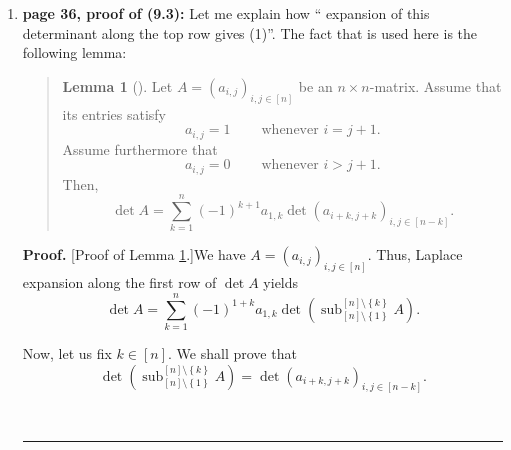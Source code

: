 \documentclass[numbers=enddot,12pt,final,onecolumn,notitlepage]{scrartcl}%
\newenvironment{statement}{\begin{quote}}{\end{quote}}
\theoremstyle{definition}
\newtheorem{lem}[theo]{Lemma}
\newenvironment{lemmain}[1][]
{\begin{statement}\begin{lem}[#1]}
{\end{lem}\end{statement}}
\newenvironment{proof}[1][Proof]{\noindent\textbf{#1.} }{\ \rule{0.5em}{0.5em}}
\newenvironment{lemmain}[1][Proof]{\noindent\textbf{#1.} }{\ \rule{0.5em}{0.5em}}
\let\sumnonlimits\sum
\renewcommand{\sum}{\sumnonlimits\limits}
\begin{document}
\begin{enumerate}
Again, this can be done by observing that both matrices belong to the group
$\operatorname*{UT}\nolimits_{I}$ of all upper unitriangular matrices with
rows and columns indexed by the elements of $I$.

\item \textbf{page 36, proof of (9.3):} Let me explain how \textquotedblleft
expansion of this determinant along the top row gives (1)\textquotedblright.
The fact that is used here is the following lemma:

\begin{lemmain}
\label{lem.36.det-hess}Let $A=\left(  a_{i,j}\right)  _{i,j\in\left[
n\right]  }$ be an $n\times n$-matrix. Assume that its entries satisfy%
\begin{equation}
a_{i,j}=1\ \ \ \ \ \ \ \ \ \ \text{whenever }i=j+1.
\label{eq.lem.36.det-hess.ass.1}%
\end{equation}
Assume furthermore that%
\begin{equation}
a_{i,j}=0\ \ \ \ \ \ \ \ \ \ \text{whenever }i>j+1.
\label{eq.lem.36.det-hess.ass.0}%
\end{equation}
Then,%
\[
\det A=\sum_{k=1}^{n}\left(  -1\right)  ^{k+1}a_{1,k}\det\left(
a_{i+k,j+k}\right)  _{i,j\in\left[  n-k\right]  }.
\]

\end{lemmain}

\begin{proof}
[Proof of Lemma \ref{lem.36.det-hess}.]We have $A=\left(  a_{i,j}\right)
_{i,j\in\left[  n\right]  }$. Thus, Laplace expansion along the first row of
$\det A$ yields%
\begin{equation}
\det A=\sum_{k=1}^{n}\left(  -1\right)  ^{1+k}a_{1,k}\det\left(
\operatorname*{sub}\nolimits_{\left[  n\right]  \setminus\left\{  1\right\}
}^{\left[  n\right]  \setminus\left\{  k\right\}  }A\right)  .
\label{pf.lem.36.det-hess.1}%
\end{equation}


Now, let us fix $k\in\left[  n\right]  $. We shall prove that%
\[
\det\left(  \operatorname*{sub}\nolimits_{\left[  n\right]  \setminus\left\{
1\right\}  }^{\left[  n\right]  \setminus\left\{  k\right\}  }A\right)
=\det\left(  a_{i+k,j+k}\right)  _{i,j\in\left[  n-k\right]  }.
\]



\end{proof}
\end{enumerate}
\end{document}
